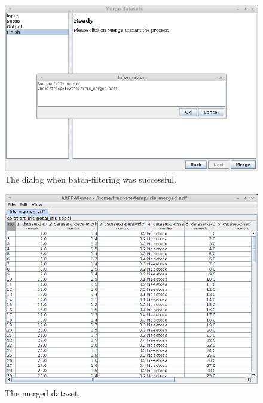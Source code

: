 \begin{figure}[htb]
  \centering
  \includegraphics[width=12.0cm]{images/merge_datasets4.png}
  \caption{The dialog when batch-filtering was successful.}
  \label{merge_datasets4}
\end{figure}

\begin{figure}[htb]
  \centering
  \includegraphics[width=12.0cm]{images/merge_datasets-output.png}
  \caption{The merged dataset.}
  \label{merge_datasets-output}
\end{figure}
